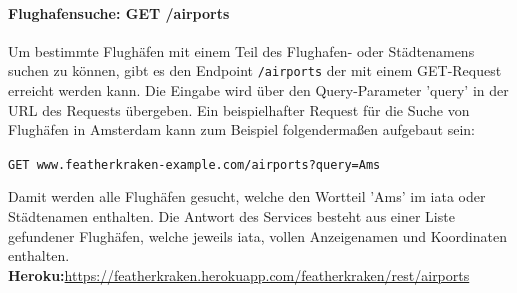 \documentclass[12pt,twoside,a4paper]{article}
\begin{document}
\begin{sloppypar}
\paragraph[Flughafensuche]{Flughafensuche: GET /airports}\label{sec:airport-search}
Um bestimmte Flughäfen mit einem Teil des Flughafen- oder Städtenamens suchen zu können, gibt es den Endpoint \texttt{/airports} der mit einem GET-Request erreicht werden kann. Die Eingabe wird über den Query-Parameter 'query' in der URL des Requests übergeben. Ein beispielhafter Request für die Suche von Flughäfen in Amsterdam kann zum Beispiel folgendermaßen aufgebaut sein:\\
\begin{center}
	\texttt{GET www.featherkraken-example.com/airports?query=Ams}
\end{center}
Damit werden alle Flughäfen gesucht, welche den Wortteil 'Ams' im \acrlong{iata} oder Städtenamen enthalten. Die Antwort des Services besteht aus einer Liste gefundener Flughäfen, welche jeweils \acrlong{iata}, vollen Anzeigenamen und Koordinaten enthalten.\\
\textbf{Heroku:}\hfill \href{https://featherkraken.herokuapp.com/featherkraken/rest/airports?query=Ams}{https://featherkraken.herokuapp.com/featherkraken/rest/airports}

\end{sloppypar}
\end{document}
